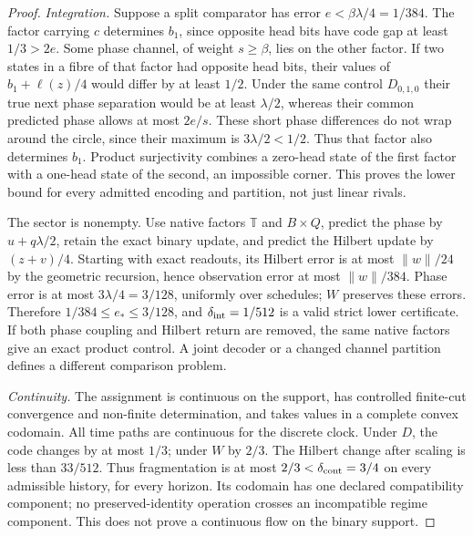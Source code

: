 \documentclass[11pt,a4paper]{article}
\theoremstyle{definition}
\begin{document}
\begin{proof}
\emph{Integration.} Suppose a split comparator has error $e<\beta\lambda/4=1/384$. The factor carrying $c$ determines $b_1$, since opposite head bits have code gap at least $1/3>2e$. Some phase channel, of weight $s\ge\beta$, lies on the other factor. If two states in a fibre of that factor had opposite head bits, their values of $b_1+\ell(z)/4$ would differ by at least $1/2$. Under the same control $D_{0,1,0}$ their true next phase separation would be at least $\lambda/2$, whereas their common predicted phase allows at most $2e/s$. These short phase differences do not wrap around the circle, since their maximum is $3\lambda/2<1/2$. Thus that factor also determines $b_1$. Product surjectivity combines a zero-head state of the first factor with a one-head state of the second, an impossible corner. This proves the lower bound for every admitted encoding and partition, not just linear rivals.

The sector is nonempty. Use native factors $\mathbb T$ and $B\times Q$, predict the phase by $u+q\lambda/2$, retain the exact binary update, and predict the Hilbert update by $(z+v)/4$. Starting with exact readouts, its Hilbert error is at most $\|w\|/24$ by the geometric recursion, hence observation error at most $\|w\|/384$. Phase error is at most $3\lambda/4=3/128$, uniformly over schedules; $W$ preserves these errors. Therefore $1/384\le e_*\le3/128$, and $\delta_{\rm int}=1/512$ is a valid strict lower certificate. If both phase coupling and Hilbert return are removed, the same native factors give an exact product control. A joint decoder or a changed channel partition defines a different comparison problem.

\emph{Continuity.} The assignment is continuous on the support, has controlled finite-cut convergence and non-finite determination, and takes values in a complete convex codomain. All time paths are continuous for the discrete clock. Under $D$, the code changes by at most $1/3$; under $W$ by $2/3$. The Hilbert change after scaling is less than $33/512$. Thus fragmentation is at most $2/3<\delta_{\rm cont}=3/4$ on every admissible history, for every horizon. Its codomain has one declared compatibility component; no preserved-identity operation crosses an incompatible regime component. This does not prove a continuous flow on the binary support.


\end{proof}
\end{document}
